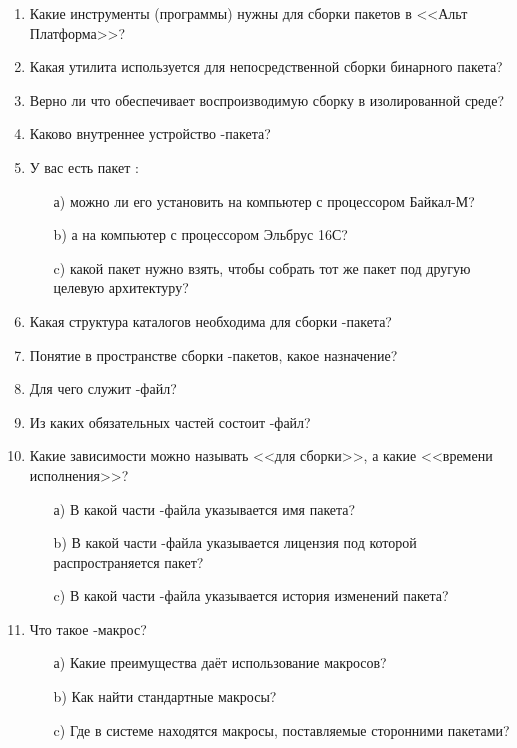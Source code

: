 \begin{enumerate}
\item Какие инструменты (программы) нужны для сборки пакетов в <<Альт Платформа>>?
\item Какая утилита используется для непосредственной сборки бинарного пакета?
\item Верно ли что  обеспечивает воспроизводимую сборку в изолированной среде?
\item Каково внутреннее устройство -пакета?
\item У вас есть пакет :
	\begin{enumerate}
		\item[а)] можно ли его установить на компьютер с процессором Байкал-М?
		\item[b)] а на компьютер с процессором Эльбрус 16С?
		\item[c)] какой пакет нужно взять, чтобы собрать тот же пакет под другую целевую архитектуру?
	\end{enumerate}
\item Какая структура каталогов необходима для сборки -пакета?
\item Понятие  в пространстве сборки -пакетов, какое назначение?
\item Для чего служит -файл?
\item Из каких обязательных частей состоит -файл?
\item Какие зависимости можно называть <<для сборки>>, а какие <<времени исполнения>>?
	\begin{enumerate}
		\item[а)] В какой части -файла указывается имя пакета?
		\item[b)] В какой части -файла указывается лицензия под которой распространяется пакет?
		\item[c)] В какой части -файла указывается история изменений пакета?
	\end{enumerate}
\item Что такое -макрос?
	\begin{enumerate}
		\item[а)] Какие преимущества даёт использование макросов?
		\item[b)] Как найти стандартные макросы?
		\item[c)] Где в системе находятся макросы, поставляемые сторонними пакетами?
	\end{enumerate}
\end{enumerate}
